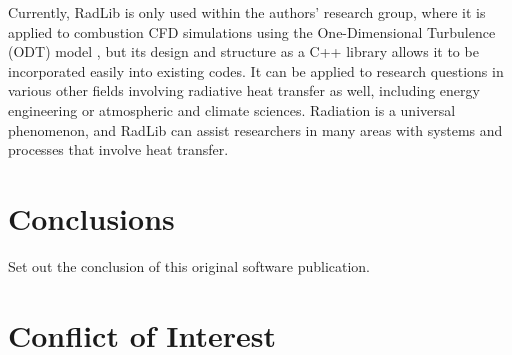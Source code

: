 \documentclass[preprint,12pt, a4paper]{elsarticle}
\begin{document}
Currently, RadLib is only used within the authors' research group, where it is applied to combustion CFD simulations using the One-Dimensional Turbulence (ODT) model \cite{Stephens_2020}, but its design and structure as a C++ library allows it to be incorporated easily into existing codes. It can be applied to  research questions in various other fields involving radiative heat transfer as well, including energy engineering or atmospheric and climate sciences. Radiation is a universal phenomenon, and RadLib can assist researchers in many areas with systems and processes that involve heat transfer. 


\section{Conclusions}
\label{}

Set out the conclusion of this original software publication.

\section{Conflict of Interest}
%
\end{document}
